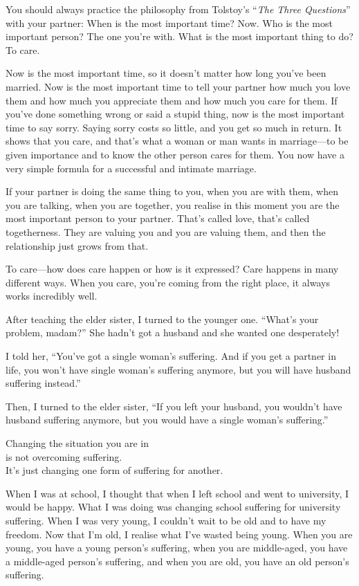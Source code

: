 \documentclass[12pt, openany]{book}
\newenvironment{aphorism}%
{%
\begin{center}\begin{itshape}
}%
{\end{itshape}\end{center}
}%
\begin{document}
You should always practice the philosophy from Tolstoy’s “\emph{The Three Questions}” with your partner: When is the most important time? Now. Who is the most important person? The one you’re with. What is the most important thing to do? To care. 

Now is the most important time, so it doesn’t matter how long you’ve been married. Now is the most important time to tell your partner how much you love them and how much you appreciate them and how much you care for them. If you’ve done something wrong or said a stupid thing, now is the most important time to say sorry. Saying sorry costs so little, and you get so much in return. It shows that you care, and that’s what a woman or man wants in marriage—to be given importance and to know the other person cares for them. You now have a very simple formula for a successful and intimate marriage. 

If your partner is doing the same thing to you, when you are with them, when you are talking, when you are together, you realise in this moment you are the most important person to your partner. That’s called love, that’s called togetherness. They are valuing you and you are valuing them, and then the relationship just grows from that. 

To care—how does care happen or how is it expressed? Care happens in many different ways. When you care, you’re coming from the right place, it always works incredibly well. 

After teaching the elder sister, I turned to the younger one. “What’s your problem, madam?” She hadn’t got a husband and she wanted one desperately! 

I told her, “You’ve got a single woman’s suffering. And if you get a partner in life, you won’t have single woman’s suffering anymore, but you will have husband suffering instead.” 

Then, I turned to the elder sister, “If you left your husband, you wouldn’t have husband suffering anymore, but you would have a single woman’s suffering.” 

\begin{aphorism}
Changing the situation you are in\\  
is not overcoming suffering.\\ 
It’s just changing one form of suffering for another.
\end{aphorism}

When I was at school, I thought that when I left school and went to university, I would be happy. What I was doing was changing school suffering for university suffering. When I was very young, I couldn’t wait to be old and to have my freedom. Now that I’m old, I realise what I’ve wasted being young. When you are young, you have a young person’s suffering, when you are middle-aged, you have a middle-aged person’s suffering, and when you are old, you have an old person’s suffering. 
\end{document}
